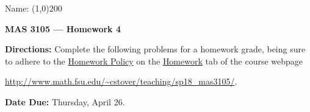 \documentclass[12 pt]{article}
\begin{document}
\begin{flushright}Name: \line(1,0){200}\end{flushright}
\begin{center}
\Large{\textbf{MAS 3105 --- Homework 4}}
\end{center}
\textbf{Directions:} Complete the following problems for a homework grade, being sure to adhere to the \ul{Homework Policy} on the \ul{Homework} tab of the course webpage
\begin{center}
	 \url{http://www.math.fsu.edu/~cstover/teaching/sp18_mas3105/}.
\end{center}
\textbf{Date Due:} Thursday, April 26.
\vspace{0.125in}
\begin{enumerate}[leftmargin=0in, rightmargin=-0.25in, itemsep=1in]
%	
%	
	

\end{enumerate}
\end{document}
